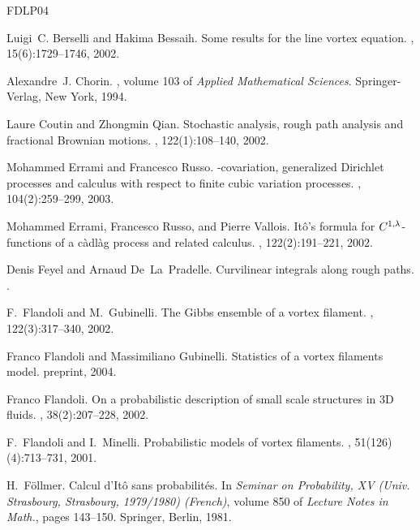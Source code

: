 \documentclass[a4paper,12pt,reqno]{amsart}
\begin{document}
%
%
\begin{thebibliography}{FDLP04}

Luigi~C. Berselli and Hakima Bessaih.
\newblock Some results for the line vortex equation.
, 15(6):1729--1746, 2002.

Alexandre~J. Chorin.
, volume 103 of {\em Applied
  Mathematical Sciences}.
\newblock Springer-Verlag, New York, 1994.

Laure Coutin and Zhongmin Qian.
\newblock Stochastic analysis, rough path analysis and fractional {B}rownian
  motions.
, 122(1):108--140, 2002.

Mohammed Errami and Francesco Russo.
-covariation, generalized {D}irichlet processes and calculus
  with respect to finite cubic variation processes.
, 104(2):259--299, 2003.

Mohammed Errami, Francesco Russo, and Pierre Vallois.
\newblock It\^o's formula for {$C\sp {1,\lambda}$}-functions of a c\`adl\`ag
  process and related calculus.
, 122(2):191--221, 2002.

Denis Feyel and Arnaud De~La~Pradelle.
\newblock Curvilinear integrals along rough paths.
.

F.~Flandoli and M.~Gubinelli.
\newblock The {G}ibbs ensemble of a vortex filament.
, 122(3):317--340, 2002.

Franco Flandoli and Massimiliano Gubinelli.
\newblock Statistics of a vortex filaments model.
\newblock preprint, 2004.

Franco Flandoli.
\newblock On a probabilistic description of small scale structures in 3{D}
  fluids.
, 38(2):207--228,
  2002.

F.~Flandoli and I.~Minelli.
\newblock Probabilistic models of vortex filaments.
, 51(126)(4):713--731, 2001.

H.~F{\"o}llmer.
\newblock Calcul d'{I}t\^o sans probabilit\'es.
\newblock In {\em Seminar on Probability, XV (Univ. Strasbourg, Strasbourg,
  1979/1980) (French)}, volume 850 of {\em Lecture Notes in Math.}, pages
  143--150. Springer, Berlin, 1981.


\end{thebibliography}
\end{document}
